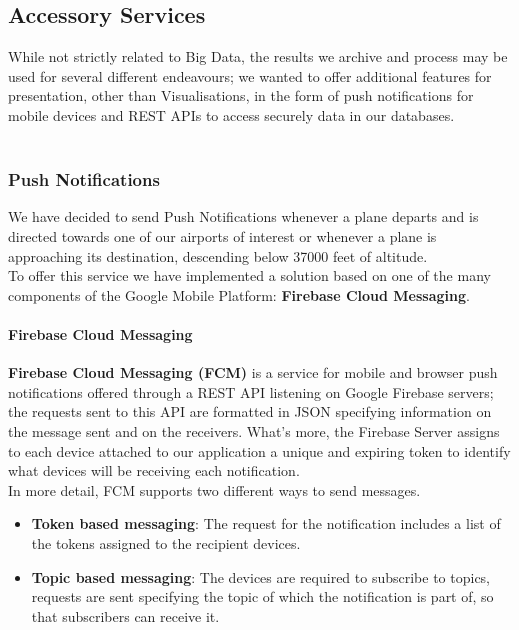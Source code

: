 \subsection{Accessory Services}

While not strictly related to Big Data, the results we archive and process may be used for several different endeavours; we wanted to offer additional features for presentation, other than Visualisations, in the form of push notifications for mobile devices and REST APIs to access securely data in our databases.
\\ \\
\subsubsection{Push Notifications}
We have decided to send Push Notifications whenever a plane departs and is directed towards one of our airports of interest or whenever a plane is approaching its destination, descending below 37000 feet of altitude.
\\
To offer this service we have implemented a solution based on one of the many components of the Google Mobile Platform: \textbf{Firebase Cloud Messaging}.

\paragraph{Firebase Cloud Messaging}

\textbf{Firebase Cloud Messaging (FCM)} is a service for mobile and browser push notifications offered through a REST API listening on Google Firebase servers; the requests sent to this API are formatted in JSON specifying information on the message sent and on the receivers.
What's more, the Firebase Server assigns to each device attached to our application a unique and expiring token to identify what devices will be receiving each notification.
\\
In more detail, FCM supports two different ways to send messages.

\begin{itemize}
	\item \textbf{Token based messaging}: The request for the notification includes a list of the tokens assigned to the recipient devices. 
	\item \textbf{Topic based messaging}: The devices are required to subscribe to topics, requests are sent specifying the topic of which the notification is part of, so that subscribers can receive it.
\end{itemize}  

